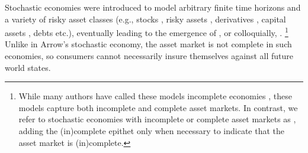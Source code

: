 Stochastic economies were introduced to model arbitrary finite time horizons \cite{radner1968competitive} and a variety of risky asset classes (e.g., stocks \cite{diamond1967incompletege}, risky assets \cite{lintner1975valuation}, derivatives \cite{black1973pricing}, capital assets \cite{mossin1966equilibrium}, debts \cite{modigliani1958cost} etc.), eventually leading to the emergence of  \cite{magill1991incomplete, magill2002theory, geanakoplos1990introduction}, or colloquially, .%
\footnote{While many authors have called these models incomplete economies \cite{geanakoplos1990introduction, magill2002theory, magill1991incomplete}, these models capture both incomplete and complete asset markets.
In contrast, we refer to stochastic economies with incomplete or complete asset markets as , adding the (in)complete epithet only when necessary to indicate that the asset market is (in)complete.}
Unlike in Arrow's stochastic economy, the asset market is not complete in such economies, so consumers cannot necessarily insure themselves against all future world states. 

